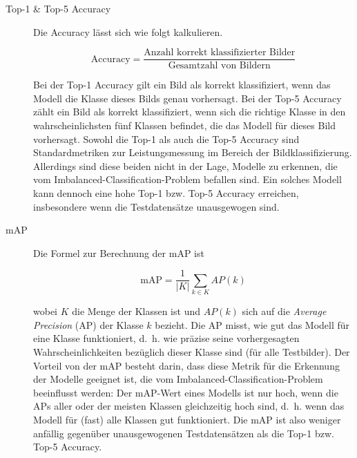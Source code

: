 \begin{description}
	\item[Top-1 \& Top-5 Accuracy] Die Accuracy lässt sich wie folgt kalkulieren.
	
	\begin{equation} \label{eq:accuracy}
		\text{Accuracy} = \frac{\text{Anzahl korrekt klassifizierter Bilder}}{\text{Gesamtzahl von Bildern}}
	\end{equation}
	
	Bei der Top-1 Accuracy gilt ein Bild als korrekt klassifiziert, wenn das Modell die Klasse dieses Bilds genau vorhersagt. Bei der Top-5 Accuracy zählt ein Bild als korrekt klassifiziert, wenn sich die richtige Klasse in den wahrscheinlichsten fünf Klassen befindet, die das Modell für dieses Bild vorhersagt. Sowohl die Top-1 als auch die Top-5 Accuracy sind Standardmetriken zur Leistungsmessung im Bereich der Bildklassifizierung. Allerdings sind diese beiden nicht in der Lage, Modelle zu erkennen, die vom Imbalanced-Classification-Problem befallen sind. Ein solches Modell kann dennoch eine hohe Top-1 bzw. Top-5 Accuracy erreichen, insbesondere wenn die Testdatensätze unausgewogen sind.
	
	\item[mAP] Die Formel zur Berechnung der mAP ist
	
	\begin{equation} \label{eq:map}
		\text{mAP} = \frac{1}{\lvert K\rvert}\sum_{k \in K}AP(k)
	\end{equation}
	
	wobei $K$ die Menge der Klassen ist und $AP(k)$ sich auf die \emph{Average Precision} (AP) der Klasse $k$ bezieht. Die AP misst, wie gut das Modell für eine Klasse funktioniert, d.~h. wie präzise seine vorhergesagten Wahrscheinlichkeiten bezüglich dieser Klasse sind (für alle Testbilder). Der Vorteil von der mAP besteht darin, dass diese Metrik für die Erkennung der Modelle geeignet ist, die vom Imbalanced-Classification-Problem beeinflusst werden: Der mAP-Wert eines Modells ist nur hoch, wenn die APs aller oder der meisten Klassen gleichzeitig hoch sind, d.~h. wenn das Modell für (fast) alle Klassen gut funktioniert. Die mAP ist also weniger anfällig gegenüber unausgewogenen Testdatensätzen als die Top-1 bzw. Top-5 Accuracy.
	
	


\end{description}
